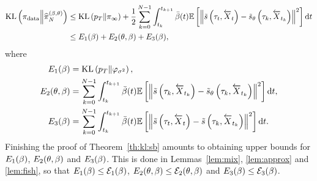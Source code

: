 \documentclass[english,graybox,envcountchap,envcountsame,sectrefs,shortlabels]{svmono}
\theoremstyle{style}
\newcommand{\eqsp}{}
\newcommand{\kl}{\mathrm{KL}}
\begin{document}
\begin{align*}
 \kl \left( \pi_{\rm data} \middle\| \pihat \right)& \leq\kl \left( p_T \| \pi_{\infty} \right) + \frac{1}{2} \sum_{k = 0}^{N-1} \int_{t_k}^{t_{k+1}} \bar \sched (t) \mathbb{E} \left[  \left\|   \tilde s\left(\tau_t,\ola X_t\right)- \tilde s_{\param}\left(\tau_k, \ola X_{t_k} \right) \right\|^2 \right] \rmd t \\
&\leq E_1(\sched) + E_2(\param,\sched) + E_3(\sched)\eqsp,
\end{align*}
where
\begin{align}
    E_1(\sched) &= \kl \left( p_T \| \gausspdf_{\sigma^2} \right)\eqsp,\label{eq:err:mix}\\
    E_2(\param,\sched) &= \sum_{k = 0}^{N-1} \int_{t_k}^{t_{k+1}} \bar \sched (t)\mathbb{E} \left[  \left\|  \tilde s\left( \tau_k, \ola X_{t_k} \right)  - \tilde s_{\param}\left(\tau_k, \ola X_{t_k} \right) \right\|^2 \right] \rmd t\eqsp,\label{eq:err:approx}\\
    E_3(\sched) &= \sum_{k = 0}^{N-1} \int_{t_k}^{t_{k+1}} \bar \sched (t)\mathbb{E} \left[  \left\| \tilde s\left(\tau_t,\ola X_t\right) -\tilde s\left( \tau_k, \ola X_{t_k} \right)   \right\|^2 \right] \rmd t\eqsp. \label{eq:err:discr}
\end{align}
Finishing the proof of Theorem~\ref{th:kl:sb} amounts to obtaining upper bounds for $E_1(\beta)$, $E_2(\theta,\beta)$ and $E_3(\beta)$. This is done in Lemmas~\ref{lem:mix}, \ref{lem:approx} and \ref{lem:fish}, so that $E_1(\beta) \leq \mathcal{E}_1(\beta)$, $E_2(\theta,\beta) \leq \mathcal{E}_2(\theta,\beta)$ and $E_3(\beta) \leq \mathcal{E}_3(\beta)$.
\end{document}
